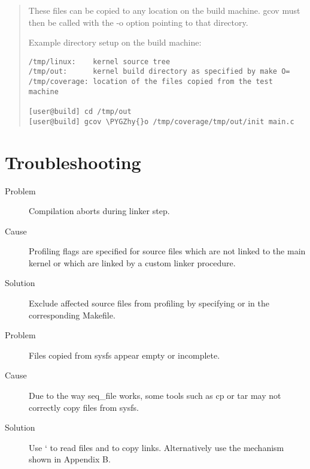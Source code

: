 \documentclass[a4paper,8pt,english]{sphinxmanual}
\def\PYGZhy{\char`\-}
\begin{document}
\begin{enumerate}
\begin{quote}
\begin{description}
\end{description}

These files can be copied to any location on the build machine. gcov
must then be called with the -o option pointing to that directory.

Example directory setup on the build machine:

\begin{Verbatim}[commandchars=\\\{\}]
/tmp/linux:    kernel source tree
/tmp/out:      kernel build directory as specified by make O=
/tmp/coverage: location of the files copied from the test machine

[user@build] cd /tmp/out
[user@build] gcov \PYGZhy{}o /tmp/coverage/tmp/out/init main.c
\end{Verbatim}
\end{quote}

\end{enumerate}


\section{Troubleshooting}
\label{dev-tools/gcov:troubleshooting}\begin{description}
\item[{Problem}] \leavevmode
Compilation aborts during linker step.

\item[{Cause}] \leavevmode
Profiling flags are specified for source files which are not
linked to the main kernel or which are linked by a custom
linker procedure.

\item[{Solution}] \leavevmode
Exclude affected source files from profiling by specifying
 or  in the
corresponding Makefile.

\item[{Problem}] \leavevmode
Files copied from sysfs appear empty or incomplete.

\item[{Cause}] \leavevmode
Due to the way seq\_file works, some tools such as cp or tar
may not correctly copy files from sysfs.

\item[{Solution}] \leavevmode
Use ` to read  files and  to copy links.
Alternatively use the mechanism shown in Appendix B.

\end{description}
\end{document}
